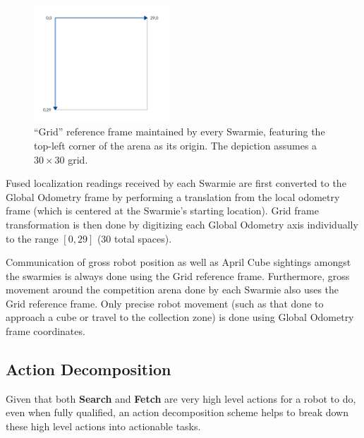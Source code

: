 \documentclass[sigconf,authordraft]{acmart}
\begin{document}
\begin{figure}[ht!]
  \centering
  \includegraphics[width=0.45\textwidth]{images/grid_ref_frame.png}
  \caption{``Grid'' reference frame maintained by every Swarmie, featuring the top-left corner of the arena as its origin. The depiction assumes a $30 \times 30$ grid.}
  \label{fig:grid_ref_frame}
\end{figure}

Fused localization readings received by each Swarmie are first converted to the Global Odometry frame by performing a translation from the local odometry frame (which is centered at the Swarmie's starting location). Grid frame transformation is then done by digitizing each Global Odometry axis individually to the range $[0, 29]$ (30 total spaces).

Communication of gross robot position as well as April Cube sightings amongst the swarmies is always done using the Grid reference frame. Furthermore, gross movement around the competition arena done by each Swarmie also uses the Grid reference frame. Only precise robot movement (such as that done to approach a cube or travel to the collection zone) is done using Global Odometry frame coordinates.

\subsection{Action Decomposition}\label{subsec:action_decomp}
Given that both \textbf{Search} and \textbf{Fetch} are very high level actions for a robot to do, even when fully qualified, an action decomposition scheme helps to break down these high level actions into actionable tasks.
\end{document}
